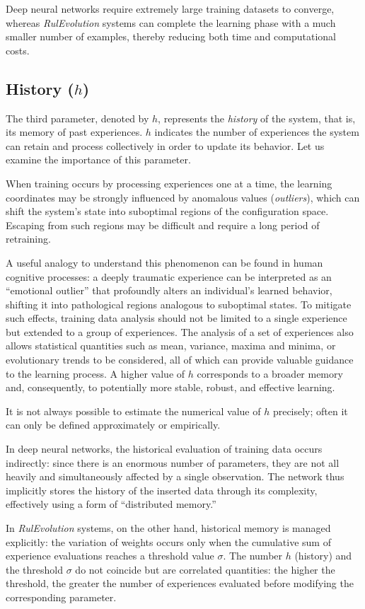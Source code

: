 \documentclass[12pt,a4paper]{article}
\begin{document}
Deep neural networks require extremely large training datasets to converge, whereas \textit{RulEvolution} systems can complete the learning phase with a much smaller number of examples, thereby reducing both time and computational costs.

\subsection{History ($h$)}
The third parameter, denoted by $h$, represents the \textit{history} of the system, that is, its memory of past experiences.  
$h$ indicates the number of experiences the system can retain and process collectively in order to update its behavior. Let us examine the importance of this parameter.

When training occurs by processing experiences one at a time, the learning coordinates may be strongly influenced by anomalous values (\textit{outliers}), which can shift the system’s state into suboptimal regions of the configuration space.  
Escaping from such regions may be difficult and require a long period of retraining.

A useful analogy to understand this phenomenon can be found in human cognitive processes: a deeply traumatic experience can be interpreted as an “emotional outlier” that profoundly alters an individual’s learned behavior, shifting it into pathological regions analogous to suboptimal states.  
To mitigate such effects, training data analysis should not be limited to a single experience but extended to a group of experiences.  
The analysis of a set of experiences also allows statistical quantities such as mean, variance, maxima and minima, or evolutionary trends to be considered, all of which can provide valuable guidance to the learning process.  
A higher value of $h$ corresponds to a broader memory and, consequently, to potentially more stable, robust, and effective learning.

It is not always possible to estimate the numerical value of $h$ precisely; often it can only be defined approximately or empirically.  

In deep neural networks, the historical evaluation of training data occurs indirectly: since there is an enormous number of parameters, they are not all heavily and simultaneously affected by a single observation.  
The network thus implicitly stores the history of the inserted data through its complexity, effectively using a form of “distributed memory.”

In \textit{RulEvolution} systems, on the other hand, historical memory is managed explicitly: the variation of weights occurs only when the cumulative sum of experience evaluations reaches a threshold value $\sigma$.  
The number $h$ (history) and the threshold $\sigma$ do not coincide but are correlated quantities: the higher the threshold, the greater the number of experiences evaluated before modifying the corresponding parameter.  
\end{document}
